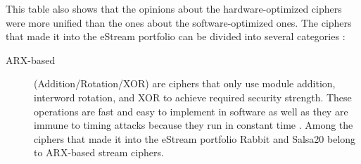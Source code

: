 	This table also shows that the opinions about the hardware-optimized ciphers were more unified than the ones about the software-optimized ones.
	The ciphers that made it into the eStream portfolio can be divided into several categories \cite{jiao2020stream}:
	\begin{description}
		\item [ARX-based] (Addition/Rotation/XOR) are ciphers that only use module addition, interword rotation, and XOR to achieve required security strength. These operations are fast and easy to implement in software as well as they are immune to timing attacks because they run in constant time \cite{jiao2020stream}.
		Among the ciphers that made it into the eStream portfolio Rabbit and Salsa20 belong to ARX-based stream ciphers.
		\begin{figure}[h]
			

\end{figure}
\end{description}
